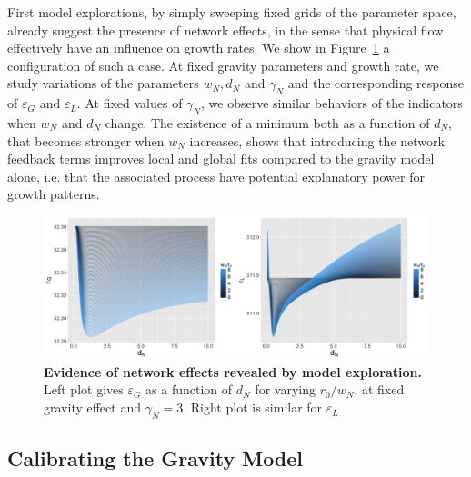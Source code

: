 \documentclass[Royal,sageh,times]{sagej}
\begin{document}
First model explorations, by simply sweeping fixed grids of the parameter space, already suggest the presence of network effects, in the sense that physical flow effectively have an influence on growth rates. We show in Figure~\ref{fig:networkeffects} a configuration of such a case. At fixed gravity parameters and growth rate, we study variations of the parameters $w_N, d_N$ and $\gamma_N$ and the corresponding response of $\varepsilon_G$ and $\varepsilon_L$. At fixed values of $\gamma_N$, we observe similar behaviors of the indicators when $w_N$ and $d_N$ change. The existence of a minimum  both as a function of $d_N$, that becomes stronger when $w_N$ increases, shows that introducing the network feedback terms improves local and global fits compared to the gravity model alone, i.e. that the associated process have potential explanatory power for growth patterns.


\begin{figure}
\centering
\includegraphics[width=\textwidth]{figures/Fig3.jpg}
\caption{\textbf{Evidence of network effects revealed by model exploration.} Left plot gives $\varepsilon_G$ as a function of $d_N$ for varying $r_0/w_N$, at fixed gravity effect and $\gamma_N=3$. Right plot is similar for $\varepsilon_L$}
\label{fig:networkeffects}
\end{figure}





\subsection*{Calibrating the Gravity Model}
\end{document}
